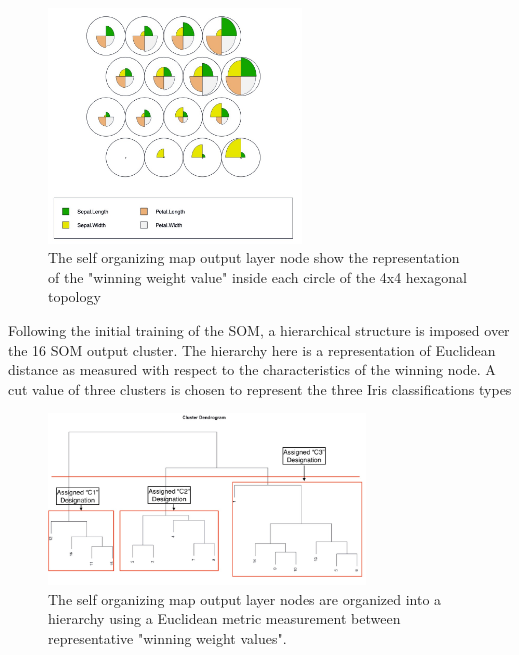 \documentclass[12pt,]{article}
\begin{document}
\begin{figure}[!h]
\begin{center}
\includegraphics[width=0.6\textwidth]{Som1.jpeg}
\end{center}
\caption[Self Organizing Map Display]{The self organizing map output layer node show the representation of the "winning weight value" inside each circle of the 4x4 hexagonal topology}
\end{figure}

Following the initial training of the SOM, a hierarchical structure is
imposed over the 16 SOM output cluster. The hierarchy here is a
representation of Euclidean distance as measured with respect to the
characteristics of the winning node. A cut value of three clusters is
chosen to represent the three Iris classifications types

\newpage

\begin{figure}[!h]
\begin{center}
\includegraphics[width=0.75\textwidth]{Dendrogram.jpeg}
\end{center}
\caption[Dendrogram]{The self organizing map output layer nodes are organized into a hierarchy using a Euclidean metric measurement between representative "winning weight values".}
\end{figure}
\end{document}
